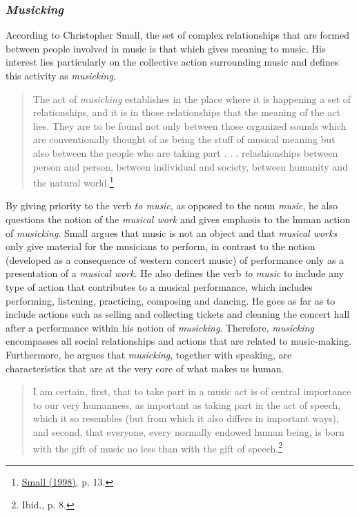 \subsubsection{\emph{Musicking}}

According to Christopher Small, the set of complex relationships that are formed between people involved in music is that which gives meaning to music. His interest lies particularly on the collective action surrounding music and defines this activity as \emph{musicking}. 
\begin{quote}
The act of \emph{musicking} establishes in the place where it is happening a set of relationships, and it is in those relationships that the meaning of the act lies. They are to be found not only between those organized sounds which are conventionally thought of as being the stuff of musical meaning but also between the people who are taking part . . . relashionships between person and person, between individual and society, between humanity and the natural world.\footnote{\hyperlink{small}{Small (1998)}, p. 13.}
\end{quote}
By giving priority to the verb \emph{to music}, as opposed to the noun \emph{music}, he also questions the notion of the \emph{musical work} and gives emphasis to the human action of \emph{musicking}. Small argues that music is not an object and that \emph{musical works} only give material for the musicians to perform, in contrast to the notion (developed as a consequence of western concert music) of performance only as a presentation of a \emph{musical work}. He also defines the verb \emph{to music} to include any type of action that contributes to a musical performance, which includes performing, listening, practicing, composing and dancing. He goes as far as to include actions such as selling and collecting tickets and cleaning the concert hall after a performance within his notion of \emph{musicking}. Therefore, \emph{musicking} encompasses all social relationships and actions that are related to music-making. Furthermore, he argues that \emph{musicking}, together with speaking, are characteristics that are at the very core of what makes us human.
 \begin{quote}
I am  certain, first, that to take part in a music act is of central importance to our very humanness, as important as taking part in the act of speech, which it so resembles (but from which it also differs in important ways), and second, that everyone, every normally endowed human being, is born with the gift of music no less than with the gift of speech.\footnote{Ibid., p. 8.}
\end{quote} 
